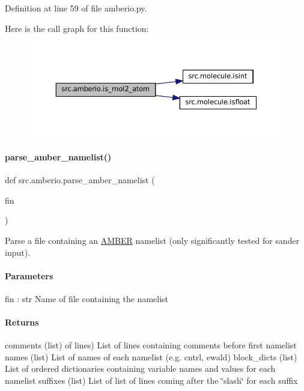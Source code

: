 Definition at line 59 of file amberio.\+py.

Here is the call graph for this function\+:
\nopagebreak
\begin{figure}[H]
\begin{center}
\leavevmode
\includegraphics[width=350pt]{namespacesrc_1_1amberio_abe9d4cfc536441837882e79989079f52_cgraph}
\end{center}
\end{figure}
\mbox{\label{namespacesrc_1_1amberio_a526ac77cde3d083631db82b2d229d2db}} 
\paragraph{\texorpdfstring{parse\+\_\+amber\+\_\+namelist()}{parse\_amber\_namelist()}}
{\footnotesize\ttfamily def src.\+amberio.\+parse\+\_\+amber\+\_\+namelist (\begin{DoxyParamCaption}\item[{}]{fin }\end{DoxyParamCaption})}



Parse a file containing an \hyperlink{classsrc_1_1amberio_1_1AMBER}{A\+M\+B\+ER} namelist (only significantly tested for sander input). 

\paragraph*{Parameters }

fin \+: str Name of file containing the namelist

\paragraph*{Returns }

comments (list) of lines) List of lines containing comments before first namelist names (list) List of names of each namelist (e.\+g. cntrl, ewald) block\+\_\+dicts (list) List of ordered dictionaries containing variable names and values for each namelist suffixes (list) List of list of lines coming after the \char`\"{}slash\char`\"{} for each suffix 

